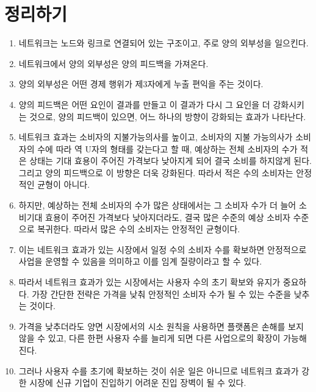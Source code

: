 \pagebreak

\section*{정리하기}
\begin{enumerate}
\item 네트워크는 노드와 링크로 연결되어 있는 구조이고, 주로 양의 외부성을 일으킨다. 
\item 네트워크에서 양의 외부성은 양의 피드백을 가져온다.
\item 양의 외부성은 어떤 경제 행위가 제3자에게 누출 편익을 주는 것이다.
\item 양의 피드백은 어떤 요인이 결과를 만들고 이 결과가 다시 그 요인을 더 강화시키는 것으로, 양의 피드백이 있으면, 어느 하나의 방향이 강화되는 효과가 나타난다.
\item 네트워크 효과는 소비자의 지불가능의사를 높이고, 소비자의 지불 가능의사가 소비자의 수에 따라 역 U자의 형태를 갖는다고 할 때, 예상하는 전체 소비자의 수가 적은 상태는 기대 효용이 주어진 가격보다 낮아지게 되어 결국 소비를 하지않게 된다. 그리고 양의 피드백으로 이 방향은 더욱 강화된다. 따라서 적은 수의 소비자는 안정적인 균형이 아니다.
\item 하지만, 예상하는 전체 소비자의 수가 많은 상태에서는 그 소비자 수가 더 늘어 소비기대 효용이 주어진 가격보다 낮아지더라도, 결국 많은 수준의 예상 소비자 수준으로 복귀한다. 따라서 많은 수의 소비자는 안정적인 균형이다.
\item 이는 네트워크 효과가 있는 시장에서 일정 수의 소비자 수를 확보하면 안정적으로 사업을 운영할 수 있음을 의미하고 이를 임계 질량이라고 할 수 있다.
\item 따라서 네트워크 효과가 있는 시장에서는 사용자 수의 초기 확보와 유지가 중요하다. 가장 간단한 전략은 가격을 낮춰 안정적인 소비자 수가 될 수 있는 수준을 낮추는 것이다.
\item 가격을 낮추더라도 양면 시장에서의 시소 원칙을 사용하면 플랫폼은 손해를 보지 않을 수 있고, 다른 한편 사용자 수를 늘리게 되면 다른 사업으로의 확장이 가능해진다.
\item 그러나 사용자 수를 초기에 확보하는 것이 쉬운 일은 아니므로 네트워크 효과가 강한 시장에 신규 기업이 진입하기 어려운 진입 장벽이 될 수 있다.
\end{enumerate}